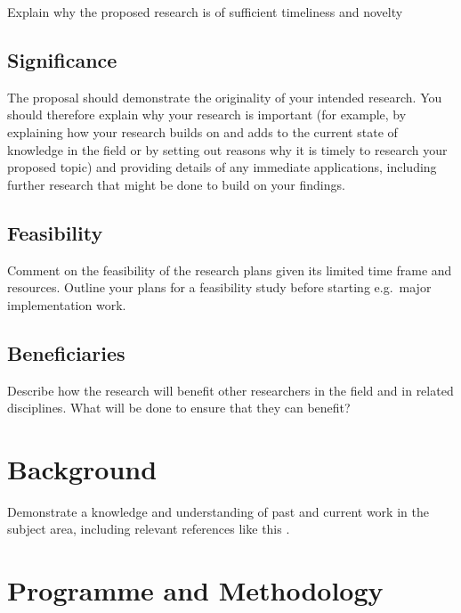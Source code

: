 \documentclass[a4paper,11pt]{article}
\begin{document}
Explain why the proposed research is of sufficient timeliness and novelty

\subsection{Significance}

The proposal should demonstrate the originality of your intended research. You should therefore explain why your research is important (for example, by explaining how your research builds on and adds to the current state of knowledge in the field or by setting out reasons why it is timely to research your proposed topic) and providing details of any immediate applications, including further research that might be done to build on your findings.

\subsection{Feasibility}

Comment on the feasibility of the research plans given its limited time frame and resources. Outline your plans for a feasibility study before starting e.g.\ major implementation work.

\subsection{Beneficiaries}

Describe how the research will benefit other researchers in the field and in related disciplines. What will be done to ensure that they can benefit? 


\section{Background}

Demonstrate a knowledge and understanding of past and current work in the subject area, including relevant references like this \cite{template}.

\section{Programme and Methodology}
\end{document}
